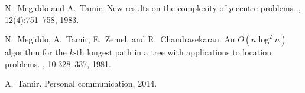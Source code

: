 \documentclass{llncs}
\begin{document}
\begin{thebibliography}{10}
N.~Megiddo and A.~Tamir.
\newblock New results on the complexity of $p$-centre problems.
, 12(4):751--758, 1983.

N.~Megiddo, A.~Tamir, E.~Zemel, and R.~Chandrasekaran.
\newblock An {$O(n \log^2 n)$} algorithm for the $k$-th longest path in a tree
  with applications to location problems.
, 10:328--337, 1981.

A.~Tamir.
\newblock Personal communication, 2014.

\end{thebibliography}
\end{document}
